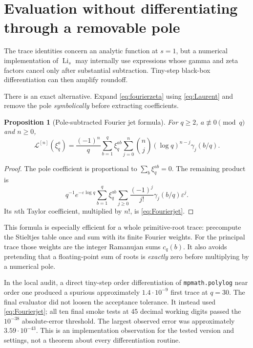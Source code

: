 \documentclass[11pt]{article}
\numberwithin{equation}{section}
\newtheorem{proposition}[theorem]{Proposition}
\theoremstyle{definition}\newtheorem{definition}[theorem]{Definition}
\theoremstyle{remark}\newtheorem{remark}[theorem]{Remark}
\DeclareMathOperator{\Li}{Li}
\newcommand{\eps}{\varepsilon}
\newcommand{\Liord}[2]{\mathcal L^{[#1]}(#2)}
\newcommand{\code}[1]{\texttt{\small #1}}
\begin{document}
\section{Evaluation without differentiating through a removable pole}

The trace identities concern an analytic function at $s=1$, but a numerical
implementation of $\Li_s$ may internally use expressions whose gamma and
zeta factors cancel only after substantial subtraction. Tiny-step
black-box differentiation can then amplify roundoff.

There is an exact alternative. Expand \eqref{eq:fourierzeta} using
\eqref{eq:Laurent} and remove the pole \emph{symbolically} before extracting
coefficients.

\begin{proposition}[Pole-subtracted Fourier jet formula]\label{prop:eval}
For $q\ge2$, $a\not\equiv0\pmod q$ and $n\ge0$,
\begin{equation}\label{eq:Fourierjet}
\Liord{n}{\xi_q^a}
=\frac{(-1)^n}{q}\sum_{b=1}^{q}\xi_q^{ab}
\sum_{j=0}^{n}\binom nj(\log q)^{n-j}\gamma_j(b/q).
\end{equation}
\end{proposition}
\begin{proof}
The pole coefficient is proportional to $\sum_b\xi_q^{ab}=0$.
The remaining product is
\[
q^{-1}e^{-\eps\log q}
\sum_{b=1}^q\xi_q^{ab}
\sum_{j\ge0}\frac{(-1)^j}{j!}\gamma_j(b/q)\eps^j.
\]
Its $n$th Taylor coefficient, multiplied by $n!$, is
\eqref{eq:Fourierjet}.
\end{proof}

This formula is especially efficient for a whole primitive-root trace:
precompute the Stieltjes table once and sum with its finite Fourier weights.
For the principal trace those weights are the integer Ramanujan sums
$c_q(b)$. It also avoids pretending that a floating-point sum of roots is
\emph{exactly} zero before multiplying by a numerical pole.

In the local audit, a direct tiny-step order differentiation of
\code{mpmath.polylog} near order one produced a spurious approximately
$1.4\cdot10^{-9}$ first trace at $q=30$. The final evaluator did not loosen
the acceptance tolerance. It instead used \eqref{eq:Fourierjet}; all ten
final smoke tests at 45 decimal working digits passed the $10^{-38}$
absolute-error threshold. The largest observed error was approximately
$3.59\cdot10^{-43}$. This is an implementation observation for the tested
version and settings, not a theorem about every differentiation routine.
\end{document}

